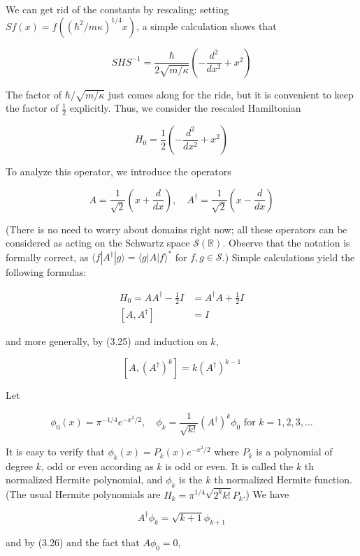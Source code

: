 \documentclass[10pt, letterpaper]{article}
\begin{document}
We can get rid of the constants by rescaling: setting $S f(x)=f\left(\left(\hbar^{2} / m \kappa\right)^{1 / 4} x\right)$, a simple calculation shows that

$$
S H S^{-1}=\frac{\hbar}{2 \sqrt{m / \kappa}}\left(-\frac{d^{2}}{d x^{2}}+x^{2}\right)
$$

The factor of $\hbar / \sqrt{m / \kappa}$ just comes along for the ride, but it is convenient to keep the factor of $\frac{1}{2}$ explicitly. Thus, we consider the rescaled Hamiltonian

$$
H_{0}=\frac{1}{2}\left(-\frac{d^{2}}{d x^{2}}+x^{2}\right)
$$

To analyze this operator, we introduce the operators

$$
A=\frac{1}{\sqrt{2}}\left(x+\frac{d}{d x}\right), \quad A^{\dagger}=\frac{1}{\sqrt{2}}\left(x-\frac{d}{d x}\right)
$$

(There is no need to worry about domains right now; all these operators can be considered as acting on the Schwartz space $\mathcal{S}(\mathbb{R})$. Observe that the notation is formally correct, as $\langle f| A^{\dagger}|g\rangle=\langle g| A|f\rangle^{*}$ for $f, g \in \mathcal{S}$.) Simple calculations yield the following formulas:

$$
\begin{aligned}
H_{0}=A A^{\dagger}-\frac{1}{2} I & =A^{\dagger} A+\frac{1}{2} I \\
{\left[A, A^{\dagger}\right] } & =I
\end{aligned}
$$

and more generally, by (3.25) and induction on $k$,

$$
\left[A,\left(A^{\dagger}\right)^{k}\right]=k\left(A^{\dagger}\right)^{k-1}
$$

Let

$$
\phi_{0}(x)=\pi^{-1 / 4} e^{-x^{2} / 2}, \quad \phi_{k}=\frac{1}{\sqrt{k!}}\left(A^{\dagger}\right)^{k} \phi_{0} \text { for } k=1,2,3, \ldots
$$

It is easy to verify that $\phi_{k}(x)=P_{k}(x) e^{-x^{2} / 2}$ where $P_{k}$ is a polynomial of degree $k$, odd or even according as $k$ is odd or even. It is called the $k$ th normalized Hermite polynomial, and $\phi_{k}$ is the $k$ th normalized Hermite function. (The usual Hermite polynomials are $H_{k}=\pi^{1 / 4} \sqrt{2^{k} k!} P_{k}$.) We have

$$
A^{\dagger} \phi_{k}=\sqrt{k+1} \phi_{k+1}
$$

and by (3.26) and the fact that $A \phi_{0}=0$,
\end{document}
